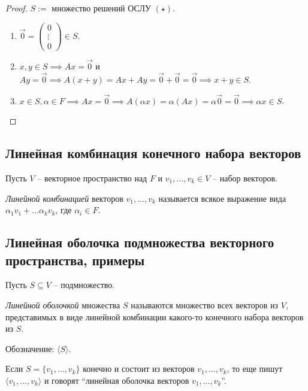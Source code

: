 \begin{proof}
    $S := $ множество решений ОСЛУ $(\star)$.
    \begin{enumerate}
        \item $\overrightarrow{0} = \begin{pmatrix} 0 \\ \vdots \\ 0 \end{pmatrix} \in S$.
        \item $x, y \in S \implies Ax = \overrightarrow{0}$ и $Ay = \overrightarrow{0} \implies A(x + y) = Ax + Ay = \overrightarrow{0} + \overrightarrow{0} = \overrightarrow{0} \implies x + y \in S$.
        \item $x \in S, \alpha \in F \implies Ax = \overrightarrow{0} \implies A(\alpha x) = \alpha (Ax) = \alpha \overrightarrow{0} = \overrightarrow{0} \implies \alpha x \in S$. \qedhere
    \end{enumerate}
\end{proof}


\subsection{Линейная комбинация конечного набора векторов}

Пусть $V$ -- векторное пространство над $F$ и $v_1, \dots, v_k \in V$ -- набор векторов.

\begin{definition}
    \textit{Линейной комбинацией} векторов $v_1, \dots, v_k$ называется всякое выражение вида $\alpha_1 v_1 + \dots \alpha_k v_k$, где $\alpha_i \in F$.
\end{definition}

\subsection{Линейная оболочка подмножества векторного пространства, примеры}

Пусть $S \subseteq V$ -- подмножество.

\begin{definition}
    \textit{Линейной оболочкой} множества $S$ называются множество всех векторов из $V$, представимых в виде линейной комбинации какого-то конечного набора векторов из $S$.

    Обозначение: $\langle S \rangle$.
\end{definition}

Если $S = \{v_1, \dots, v_k\}$ конечно и состоит из векторов $v_1, \dots, v_k$, то еще пишут $\langle v_1, \dots, v_k \rangle$ и говорят ``линейная оболочка векторов $v_1, \dots, v_k$''.

